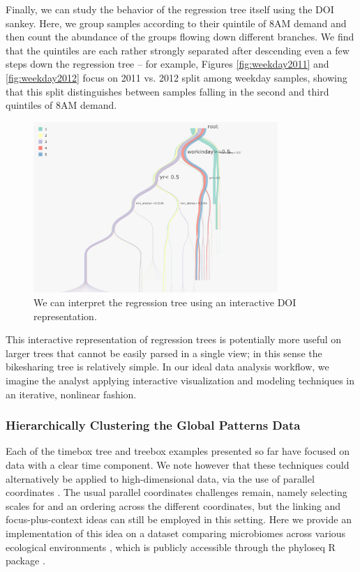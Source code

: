 \documentclass[12pt]{article}
\begin{document}
Finally, we can study the behavior of the regression tree itself using
the DOI sankey. Here, we group samples according to their quintile of
8AM demand and then count the abundance of the groups flowing down
different branches. We find that the quintiles are each rather strongly
separated after descending even a few steps down the regression tree --
for example, Figures \ref{fig:weekday2011} and \ref{fig:weekday2012}
focus on 2011 vs. 2012 split among weekday samples, showing that this
split distinguishes between samples falling in the second and third
quintiles of 8AM demand.

\begin{figure}

{\centering \includegraphics[width=350px]{figure/bike_sankey}

}

\caption{We can interpret the regression tree using an interactive DOI representation.}\label{fig:bikesankey}
\end{figure}

This interactive representation of regression trees is potentially more
useful on larger trees that cannot be easily parsed in a single view; in
this sense the bikesharing tree is relatively simple. In our ideal data
analysis workflow, we imagine the analyst applying interactive
visualization and modeling techniques in an iterative, nonlinear
fashion.

\subsubsection*{Hierarchically Clustering the Global Patterns Data}\label{global_patterns}

Each of the timebox tree and treebox examples presented so far have
focused on data with a clear time component. We note however that these
techniques could alternatively be applied to high-dimensional data, via
the use of parallel coordinates \citep{inselberg1991parallel}. The usual
parallel coordinates challenges remain, namely selecting scales for and an
ordering across the different coordinates, but the linking and
focus-plus-context ideas can still be employed in this setting. Here we
provide an implementation of this idea on a dataset comparing microbiomes across
various ecological environments \citep{caporaso2011global}, which is publicly
accessible through the phyloseq R package \citep{mcmurdie2013phyloseq}.
\end{document}
